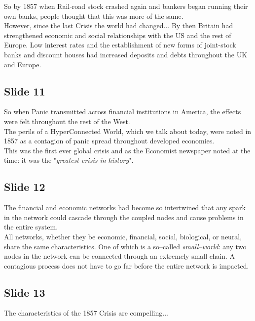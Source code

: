 \documentclass[a4paper, 11pt]{article} %
\begin{document}
So by 1857 when Rail-road stock crashed again and bankers began running their own banks, people thought that this was more of the same.\\

However, since the last Crisis the world had changed... By then Britain had strengthened economic and social relationships with the US and the rest of Europe. Low interest rates and the establishment of new forms of joint-stock banks and discount houses had increased deposits and debts throughout the UK and Europe.



\subsection*{Slide 11}

So when Panic transmitted across financial institutions in America, the effects were felt throughout the rest of the West.\\

The perils of a HyperConnected World, which we talk about today, were noted in 1857 as a contagion of panic spread throughout developed economies.\\

This was the first ever global crisis and as the Economist newspaper noted at the time: it was the "\textit{greatest crisis in history}".


\subsection*{Slide 12}

The financial and economic networks had become so intertwined that any spark in the network could cascade through the coupled nodes and cause problems in the entire system.\\

All networks, whether they be economic, financial, social, biological, or neural, share the same characteristics. One of which is a so--called \textit{small--world}: any two nodes in the network can be connected through an extremely small chain. A contagious process does not have to go far before the entire network is impacted.


\subsection*{Slide 13}

The characteristics of the 1857 Crisis are compelling...
\end{document}
